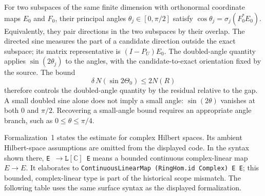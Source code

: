 For two subspaces of the same finite dimension with orthonormal coordinate
maps $E_0$ and $F_0$, their principal angles $\theta_j\in[0,\pi/2]$ satisfy
$\cos\theta_j=\sigma_j(F_0^*E_0)$.  Equivalently, they pair directions in the two
subspaces by their overlap.  The directed sine measures the part of a candidate
direction outside the exact subspace; its matrix representative is
$(I-P_U)E_0$.  The doubled-angle quantity applies $\sin(2\theta_j)$ to the
angles, with the candidate-to-exact orientation fixed by the source.  The bound
\[
  \delta\,N(\sin 2\Theta_0)\le 2N(R)
\]
therefore controls the doubled-angle quantity by the residual relative to the
gap.  A small doubled sine alone does not imply a small angle:
$\sin(2\theta)$ vanishes at both $0$ and $\pi/2$.  Recovering a small-angle bound
requires an appropriate angle branch, such as $0\le\theta\le\pi/4$.

Formalization~1 states the estimate for complex Hilbert spaces.  Its ambient
Hilbert-space assumptions are omitted from the displayed code.  In the syntax
shown there, \texttt{E }$\mathrel{\to}\!\mathtt{L}[\mathbb C]$\texttt{ E}
means a bounded continuous complex-linear map $E\to E$.  It elaborates to
\texttt{ContinuousLinearMap (RingHom.id Complex) E E}; this bounded,
complex-linear type is part of the historical scope mismatch.  The following
table uses the same surface syntax as the displayed formalization.

